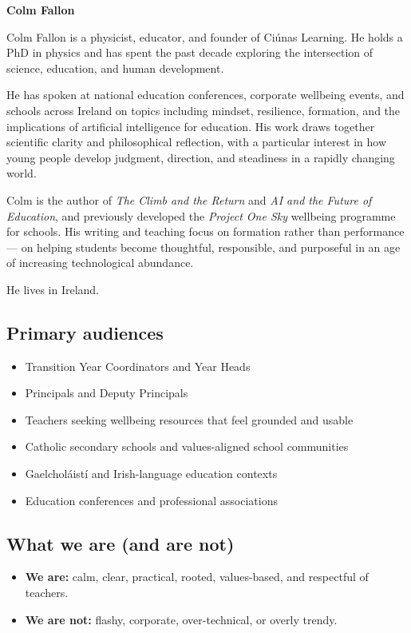 \documentclass[11pt,a4paper]{article}
\begin{document}
\textbf{Colm Fallon}

Colm Fallon is a physicist, educator, and founder of Ci\'unas Learning. He holds a PhD in physics and has spent the past decade exploring the intersection of science, education, and human development.

He has spoken at national education conferences, corporate wellbeing events, and schools across Ireland on topics including mindset, resilience, formation, and the implications of artificial intelligence for education. His work draws together scientific clarity and philosophical reflection, with a particular interest in how young people develop judgment, direction, and steadiness in a rapidly changing world.

Colm is the author of \textit{The Climb and the Return} and \textit{AI and the Future of Education}, and previously developed the \textit{Project One Sky} wellbeing programme for schools. His writing and teaching focus on formation rather than performance --- on helping students become thoughtful, responsible, and purposeful in an age of increasing technological abundance.

He lives in Ireland.

\subsection{Primary audiences}

\begin{itemize}
  \item Transition Year Coordinators and Year Heads
  \item Principals and Deputy Principals
  \item Teachers seeking wellbeing resources that feel grounded and usable
  \item Catholic secondary schools and values-aligned school communities
  \item Gaelchol\'aist\'i and Irish-language education contexts
  \item Education conferences and professional associations
\end{itemize}

\subsection{What we are (and are not)}

\begin{itemize}
  \item \textbf{We are:} calm, clear, practical, rooted, values-based, and respectful of teachers.
  \item \textbf{We are not:} flashy, corporate, over-technical, or overly \textquotesingle trendy\textquotesingle .
\end{itemize}
\end{document}
